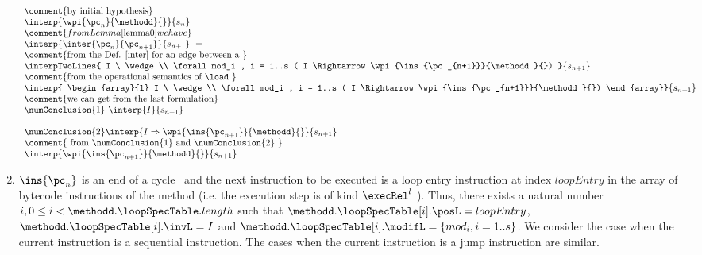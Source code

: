 \begin{enumerate}
$$ \begin{array}{l}
\mbox{\rm\comment{by initial hypothesis}} \\
\interp{\wpi{\pc_n}{\methodd}{}}{s_n} \\
\comment{from Lemma \ref{lemma0} we have }\\
\interp{\inter{\pc_n}{\pc_{n+1}}}{s_{n+1}} \ = \\

 \mbox{\rm\comment{from the Def. \ref{inter} for an edge between a  }}\\				    
            
                 \interpTwoLines{  I \  \wedge\\
                                             \forall mod_i ,  i = 1..s ( I \Rightarrow \wpi{\ins{\pc_{n+1}}}{\methodd}{}) 
                                 }  { s_{n+1}  }\\

 \mbox{\rm\comment{from the operational semantics of \load }}\\

 \interp{ 
\begin{array}{l}   I \  \wedge\\
                  \forall mod_i ,  i = 1..s ( I \Rightarrow \wpi{\ins{\pc_{n+1}}}{\methodd}{}) 
\end{array}}{s_{n+1}}  \\


\mbox{\rm \comment{we can get from the last formulation}}\\
  \numConclusion{1} \   \interp{I}   {s_{n+1} } \\
                              \\
                 \numConclusion{2}  \interp{ I \Rightarrow \wpi{\ins{\pc_{n+1}}}{\methodd}{} }
                                     {s_{n+1}  } \\
\mbox{\rm \comment{ from \numConclusion{1}  and \numConclusion{2}  }}\\
  \interp{ \wpi{\ins{\pc_{n+1}}}{\methodd}{} }{s_{n+1}  }\\
\end{array} $$
\item $\ins{\pc_n} $ is an end of a cycle \ and the next instruction to be executed is a loop entry 
instruction at index $loopEntry $ in the array of bytecode instructions of the method \methodd
 (i.e. the execution step is of kind $\execRel^l$ ).
 Thus, there exists a natural number  $ i , 0 \le i < \methodd.\loopSpecTable.length   $   such that
 $ \methodd. \loopSpecTable[i].\posL = loopEntry $,  $ \methodd. \loopSpecTable[i].\invL = I $ and
   $ \methodd. \loopSpecTable[i].\modifL =\{ mod_i, i = 1..s \}$.
We consider the case when the current instruction is a sequential instruction. The cases when the current instruction 
is a jump instruction are similar.   \\ 
		

\end{enumerate}

